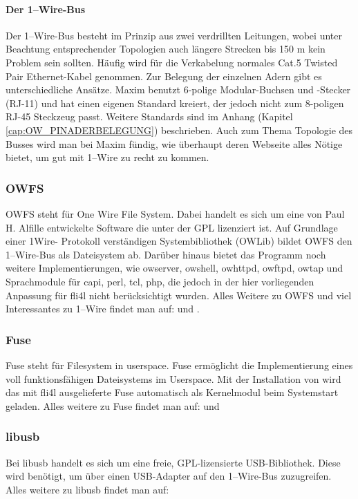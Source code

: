 \paragraph{Der 1--Wire-Bus}
Der 1--Wire-Bus besteht im Prinzip aus zwei verdrillten Leitungen, wobei unter Beachtung
entsprechender Topologien auch längere Strecken bis 150 m kein Problem sein
sollten. Häufig wird für die Verkabelung normales Cat.5 Twisted Pair Ethernet-Kabel
genommen.
Zur Belegung der einzelnen Adern gibt es unterschiedliche Ansätze. Maxim benutzt
6-polige Modular-Buchsen und -Stecker (RJ-11) und hat einen eigenen Standard
kreiert, der jedoch nicht zum 8-poligen RJ-45 Steckzeug passt. Weitere Standards
sind im Anhang (Kapitel \ref{cap:OW_PINADERBELEGUNG}) beschrieben.
Auch zum Thema Topologie des Busses wird man bei Maxim fündig, wie überhaupt
deren Webseite alles Nötige bietet, um gut mit 1--Wire zu recht zu kommen.

{
\subsubsection{OWFS}
}
OWFS steht für \glqq{}One Wire File System\grqq{}. Dabei handelt es sich um eine von Paul H.
Alfille entwickelte Software die unter der GPL lizenziert ist. Auf Grundlage einer 1Wire-
Protokoll verständigen Systembibliothek (OWLib) bildet OWFS den 1--Wire-Bus
als Dateisystem ab. Darüber hinaus bietet das Programm noch weitere Implementierungen,
wie owserver, owshell, owhttpd, owftpd, owtap und Sprachmodule für capi,
perl, tcl, php, die jedoch in der hier vorliegenden Anpassung für fli4l nicht berücksichtigt
wurden. Alles Weitere zu OWFS und viel Interessantes zu 1--Wire findet man
auf: und .

\subsubsection{Fuse}
Fuse steht für \glqq{}Filesystem in userspace\grqq{}. Fuse ermöglicht die Implementierung eines
voll funktionsfähigen Dateisystems im Userspace.
Mit der Installation von  wird das mit fli4l ausgelieferte Fuse automatisch
als Kernelmodul beim Systemstart geladen. Alles weitere zu Fuse findet man auf:
 und 

\subsubsection{libusb}
Bei libusb handelt es sich um eine freie, GPL-lizensierte USB-Bibliothek. Diese wird
benötigt, um über einen USB-Adapter auf den 1--Wire-Bus zuzugreifen.
Alles weitere zu libusb findet man auf: 


